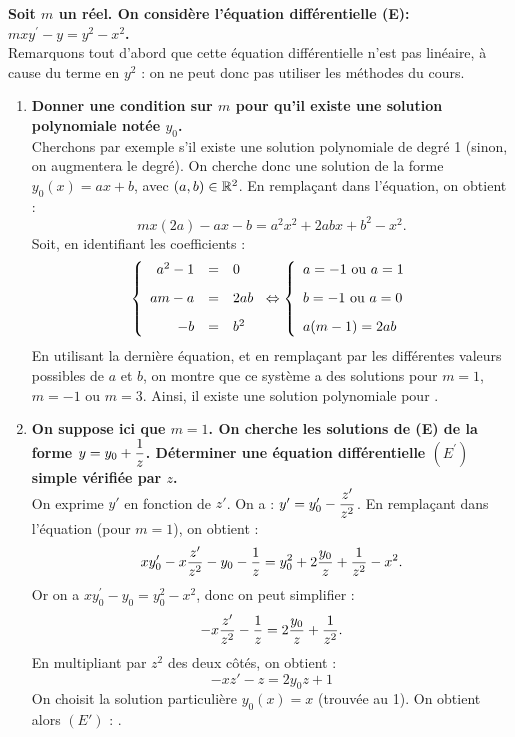 \documentclass[a4paper, 11pt,reqno]{article}
\begin{document}
\begin{correction}  \;
\textbf{Soit $m$ un r\'eel. On consid\`ere l'\'equation diff\'erentielle (E): $mxy^{\prime} -y=y^2-x^2$.}\\
Remarquons tout d'abord que cette \'equation diff\'erentielle n'est pas lin\'eaire, \`a cause du terme en $y^2$ : on ne peut donc pas utiliser les m\'ethodes du cours.
\begin{enumerate}
\item \textbf{Donner une condition sur $m$ pour qu'il existe une solution polynomiale not\'ee $y_0$.}\\
Cherchons par exemple s'il existe une solution polynomiale de degr\'e 1 (sinon, on augmentera le degr\'e). On cherche donc une solution de la forme $y_0(x) = ax+ b$, avec $(a,b)\in \mathbb{R}^2$. En rempla\c cant dans l'\'equation, on obtient : 
$$mx(2a) - ax-b = a^2x^2 + 2abx + b^2 - x^2.$$
Soit, en identifiant les coefficients :
$$\left\{ \begin{array}{rcl}
a^2-1 &= & 0\vsec\\
am-a &= & 2ab\vsec\\
-b & = & b^2
\end{array} \right. \Leftrightarrow \left\{ \begin{array}{l}
a = -1 \textmd{ ou } a=1 \vsec\\
b = -1 \textmd{ ou } a=0 \vsec\\
a(m-1) = 2 ab
\end{array} \right.$$
En utilisant la derni\`ere \'equation, et en rempla\c cant par les diff\'erentes valeurs possibles de $a$ et $b$, on montre que ce syst\`eme a des solutions pour $m=1$, $m=-1$ ou $m=3$. Ainsi, il existe une solution polynomiale pour .
\item \textbf{On suppose ici que $m=1$. On cherche les solutions de (E) de la forme $y=y_0+\displaystyle\frac{1}{z}$. D\'eterminer une \'equation diff\'erentielle $(E^{\prime})$ simple v\'erifi\'ee par $z$.}\\
On exprime $y'$ en fonction de $z'$. On a : $y' = y'_0- \displaystyle \frac{z'}{z^2}$. En rempla\c cant dans l'\'equation (pour $m=1$), on obtient :
$$xy'_0 - x \displaystyle \frac{z'}{z^2} - y_0- \frac{1}{z} = y_0^2 +2\frac{y_0}{z} + \frac{1}{z^2} - x^2.$$
Or on a $xy_0^{\prime} -y_0=y^2_0-x^2$, donc on peut simplifier :
$$- x \displaystyle \frac{z'}{z^2} - \frac{1}{z} = 2\frac{y_0}{z} + \frac{1}{z^2}.$$
En multipliant par $z^2$ des deux c\^ot\'es, on obtient :
$$- x z' - z = 2 y_0 z +1$$
On choisit la solution particuli\`ere $y_0(x) = x$ (trouv\'ee au 1). On obtient alors $(E')$ : .

\end{enumerate}
\end{correction}
\end{document}
